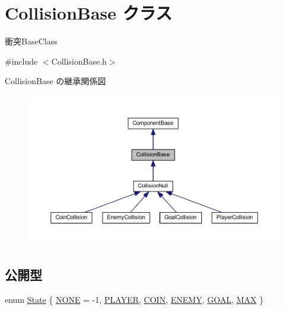 \hypertarget{class_collision_base}{}\section{Collision\+Base クラス}
\label{class_collision_base}


衝突\+Base\+Class  




{\ttfamily \#include $<$Collision\+Base.\+h$>$}



Collision\+Base の継承関係図\nopagebreak
\begin{figure}[H]
\begin{center}
\leavevmode
\includegraphics[width=350pt]{class_collision_base__inherit__graph}
\end{center}
\end{figure}
\subsection*{公開型}
\begin{DoxyCompactItemize}
\item 
enum \mbox{\hyperlink{class_collision_base_a4dd1ed00099a19c0176913af93c4e365}{State}} \{ \newline
\mbox{\hyperlink{class_collision_base_a4dd1ed00099a19c0176913af93c4e365a2682042c400780d05da0db180ef89526}{N\+O\+NE}} = -\/1, 
\mbox{\hyperlink{class_collision_base_a4dd1ed00099a19c0176913af93c4e365ae1aee076cb40136904a2300425bba493}{P\+L\+A\+Y\+ER}}, 
\mbox{\hyperlink{class_collision_base_a4dd1ed00099a19c0176913af93c4e365aeda009ba3599abbdb45a16ecaaf075e5}{C\+O\+IN}}, 
\mbox{\hyperlink{class_collision_base_a4dd1ed00099a19c0176913af93c4e365a90a5e8c5c8fa7a3ba38c80b583de37ce}{E\+N\+E\+MY}}, 
\newline
\mbox{\hyperlink{class_collision_base_a4dd1ed00099a19c0176913af93c4e365a82a11a1a3c44c82bd7909f48ed57fa62}{G\+O\+AL}}, 
\mbox{\hyperlink{class_collision_base_a4dd1ed00099a19c0176913af93c4e365aa7c59b2c2f20cbc76a01c38a1ebb6fea}{M\+AX}}
 \}
\end{DoxyCompactItemize}
